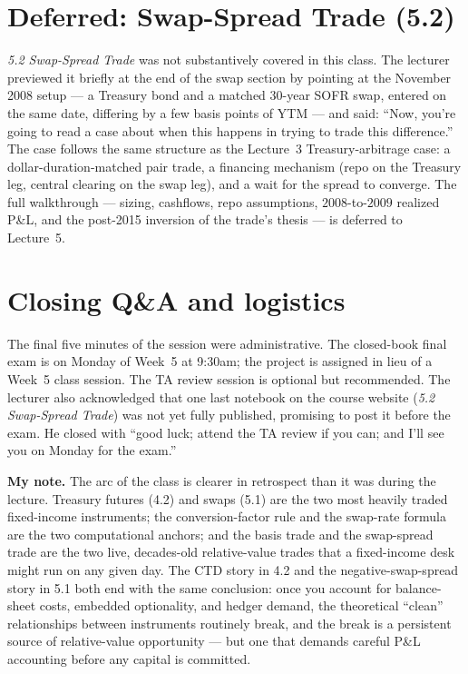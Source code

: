 \section{Deferred: Swap-Spread Trade (5.2)}\label{L4-sec:swap-spread-pointer}

\emph{5.2 Swap-Spread Trade} was not substantively covered in this class.
The lecturer previewed it briefly at the end of the swap section by
pointing at the November 2008 setup --- a Treasury bond and a matched
30-year SOFR swap, entered on the same date, differing by a few basis
points of YTM --- and said: ``Now, you're going to read a case about when
this happens in trying to trade this difference.'' The case follows the
same structure as the Lecture~3 Treasury-arbitrage case: a
dollar-duration-matched pair trade, a financing mechanism (repo on the
Treasury leg, central clearing on the swap leg), and a wait for the
spread to converge. The full walkthrough --- sizing, cashflows, repo
assumptions, $2008$-to-$2009$ realized P\&L, and the post-2015 inversion
of the trade's thesis --- is deferred to Lecture~5.

\section{Closing Q\&A and logistics}\label{L4-sec:closing}

The final five minutes of the session were administrative. The closed-book
final exam is on Monday of Week~5 at 9:30am; the project is assigned in
lieu of a Week~5 class session. The TA review session is optional but
recommended. The lecturer also acknowledged that one last notebook on the
course website (\emph{5.2 Swap-Spread Trade}) was not yet fully published,
promising to post it before the exam. He closed with ``good luck; attend
the TA review if you can; and I'll see you on Monday for the exam.''

\begin{checkpoint}
\textbf{My note.} The arc of the class is clearer in retrospect than it
was during the lecture. Treasury futures (4.2) and swaps (5.1) are the
two most heavily traded fixed-income instruments; the conversion-factor
rule and the swap-rate formula are the two computational anchors; and
the basis trade and the swap-spread trade are the two live, decades-old
relative-value trades that a fixed-income desk might run on any given
day. The CTD story in 4.2 and the negative-swap-spread story in 5.1 both
end with the same conclusion: once you account for balance-sheet costs,
embedded optionality, and hedger demand, the theoretical ``clean''
relationships between instruments routinely break, and the break is a
persistent source of relative-value opportunity --- but one that demands
careful P\&L accounting before any capital is committed.
\end{checkpoint}
